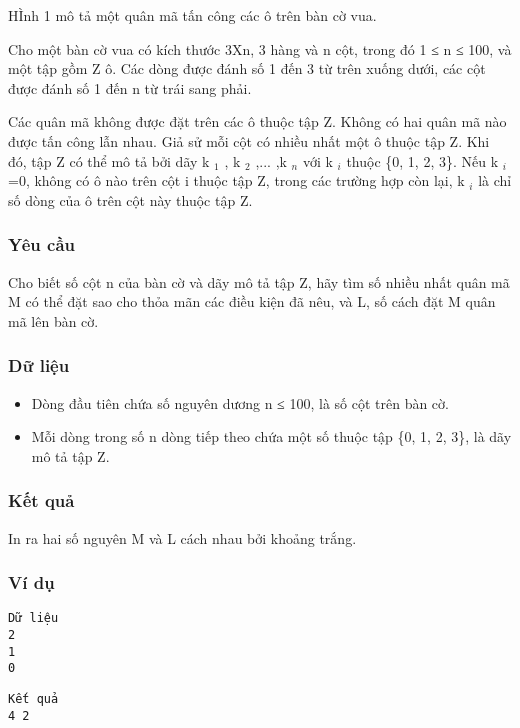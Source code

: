 



   HÌnh 1 mô tả một quân mã tấn công các ô trên bàn cờ vua.  

   Cho một bàn cờ vua có kích thước 3Xn, 3 hàng và n cột, trong đó 1 ≤ n ≤ 100, và một tập gồm Z ô. Các dòng được đánh số 1 đến 3 từ   trên xuống dưới, các cột được đánh số 1 đến n từ trái sang phải.  

   Các quân mã không được đặt trên các ô thuộc tập Z. Không có hai quân mã nào được tấn công lẫn nhau. Giả sử mỗi cột có nhiều nhất một ô   thuộc tập Z. Khi đó, tập Z có thể mô tả bởi dãy k   $_    1   $   , k   $_    2   $   ,... ,k   $_    n   $   với k   $_    i   $   thuộc \{0, 1, 2, 3\}. Nếu   k   $_    i   $   =0, không có ô nào trên cột i thuộc tập Z, trong các trường hợp còn lại, k   $_    i   $   là chỉ số dòng của ô trên cột này thuộc   tập Z.  

\subsubsection{   Yêu cầu  }

   Cho biết số cột n của bàn cờ và dãy mô tả tập Z, hãy tìm số nhiều nhất quân mã M có thể đặt sao cho thỏa mãn các điều kiện đã nêu, và L,   số cách đặt M quân mã lên bàn cờ.  



\subsubsection{   Dữ liệu  }
\begin{itemize}
	\item     Dòng đầu tiên chứa số nguyên dương n ≤ 100, là số cột trên bàn cờ.   
	\item     Mỗi dòng trong số n dòng tiếp theo chứa một số thuộc tập \{0, 1, 2, 3\}, là dãy mô tả tập Z.   
\end{itemize}

\subsubsection{   Kết quả  }

   In ra hai số nguyên M và L cách nhau bởi khoảng trắng.  

\subsubsection{   Ví dụ  }
\begin{verbatim}
Dữ liệu
2
1
0
\end{verbatim}
\begin{verbatim}
Kết quả 
4 2
\end{verbatim}